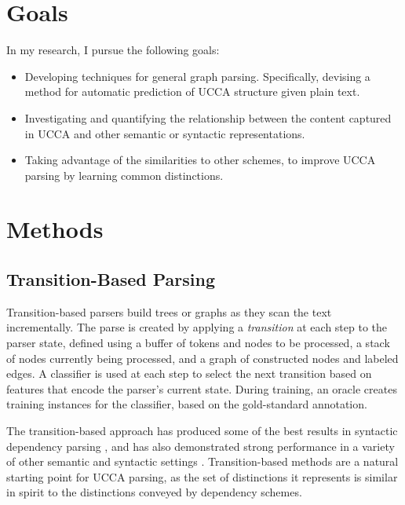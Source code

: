 \documentclass[12pt]{article}
\begin{document}
\section{Goals}\label{sec:goals}

In my research, I pursue the following goals:

\begin{itemize}
  \item Developing techniques for general graph parsing.
    Specifically, devising a method for automatic prediction of UCCA
    structure given plain text.
  \item Investigating and quantifying the relationship between the content
    captured in UCCA and other semantic or syntactic representations.
  \item Taking advantage of the similarities to other schemes,
    to improve UCCA parsing by learning common distinctions.
\end{itemize}


\section{Methods}\label{sec:methods}

\subsection{Transition-Based Parsing}\label{sec:transition_based}

Transition-based parsers \cite{Nivre03anefficient} build trees or graphs
as they scan the text incrementally.
The parse is created by applying a \textit{transition} at each step to the parser state,
defined using a buffer of tokens and nodes to be processed,
a stack of nodes currently being processed,
and a graph of constructed nodes and labeled edges.
A classifier is used at each step to select the next transition based on features
that encode the parser's current state.
During training, an oracle creates training instances for the classifier,
based on the gold-standard annotation.

The transition-based approach has produced some of the best
results in syntactic dependency parsing
\cite{kiperwasser2016simple,andor2016globally}, and has also demonstrated
strong performance in a variety of other semantic and syntactic settings
\cite{maier2015discontinuous,damonte-17}.
Transition-based methods are a natural starting point for UCCA parsing,
as the set of distinctions it represents is similar in spirit to the distinctions
conveyed by dependency schemes.
\end{document}

